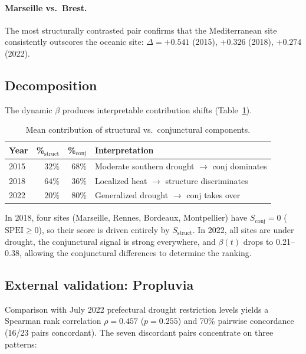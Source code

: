 \documentclass[11pt,a4paper]{article}
\begin{document}
\paragraph{Marseille vs.\ Brest.} The most structurally contrasted pair confirms that the Mediterranean site consistently outscores the oceanic site: $\Delta = +0.541$ (2015), $+0.326$ (2018), $+0.274$ (2022).

\subsection{Decomposition}

The dynamic $\beta$ produces interpretable contribution shifts (Table~\ref{tab:contrib}).

\begin{table}[h]
\centering
\small
\caption{Mean contribution of structural vs.\ conjunctural components.}
\label{tab:contrib}
\begin{tabular}{lrrl}
\toprule
Year & \%$_{\text{struct}}$ & \%$_{\text{conj}}$ & Interpretation \\
\midrule
2015 & $32\%$ & $68\%$ & Moderate southern drought $\to$ conj dominates \\
2018 & $64\%$ & $36\%$ & Localized heat $\to$ structure discriminates \\
2022 & $20\%$ & $80\%$ & Generalized drought $\to$ conj takes over \\
\bottomrule
\end{tabular}
\end{table}

In 2018, four sites (Marseille, Rennes, Bordeaux, Montpellier) have $S_{\text{conj}} = 0$ ($\text{SPEI} \geq 0$), so their score is driven entirely by $S_{\text{struct}}$. In 2022, all sites are under drought, the conjunctural signal is strong everywhere, and $\beta(t)$ drops to 0.21--0.38, allowing the conjunctural differences to determine the ranking.

\subsection{External validation: Propluvia}

Comparison with July 2022 prefectural drought restriction levels yields a Spearman rank correlation $\rho = 0.457$ ($p = 0.255$) and 70\% pairwise concordance (16/23 pairs concordant). The seven discordant pairs concentrate on three patterns:
\end{document}

